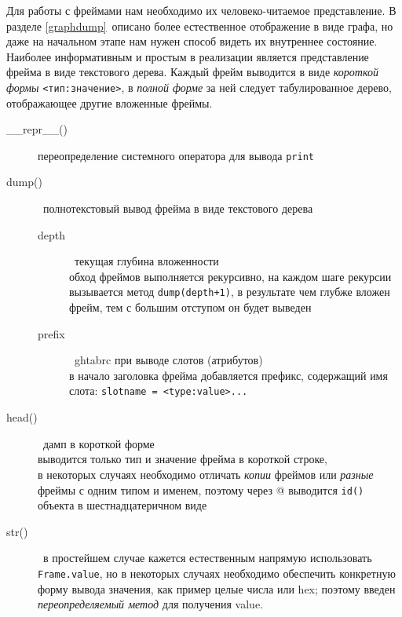 
Для работы с фреймами нам необходимо их человеко-читаемое представление. В
разделе \ref{graphdump}\ описано более естественное отображение в виде графа, но
даже на начальном этапе нам нужен способ видеть их внутреннее состояние.
Наиболее информативным и простым в реализации является представление фрейма в
виде текстового дерева. Каждый фрейм выводится в виде \emph{короткой формы}
\verb|<тип:значение>|, в \emph{полной форме} за ней следует табулированное
дерево, отображающее другие вложенные фреймы.

\smallskip
{}

\begin{description}
\item[\_\_repr\_\_()] переопределение системного оператора для вывода
\verb|print|
\item[dump()]\ полнотекстовый вывод фрейма в виде текстового дерева
\begin{description}
\item[depth]\ текущая глубина вложенности\\
обход фреймов выполняется рекурсивно, на каждом шаге рекурсии вызывается метод
\verb|dump(depth+1)|, в результате чем глубже вложен фрейм, тем с большим
отступом он будет выведен
\item[prefix]\ ghtabrc при выводе слотов (атрибутов)\\
в начало заголовка фрейма добавляется префикс, содержащий имя слота:
\verb|slotname = <type:value>...|
\end{description}
\end{description}

\smallskip
{}
 \begin{description}
\item[head()]\ дамп в короткой форме\\
выводится только тип и значение фрейма в короткой строке,\\
в некоторых случаях необходимо отличать \textit{копии} фреймов или
\textit{разные} фреймы с одним типом и именем, поэтому через @ выводится
\verb|id()| объекта в шестнадцатеричном виде
\end{description}


\begin{description}
\item[str()]\ в простейшем случае кажется естественным напрямую
использовать \verb|Frame.value|, но в некоторых случаях необходимо обеспечить
конкретную форму вывода значения, как пример целые числа или hex; поэтому
введен \emph{переопределяемый метод} для получения value.
\end{description}

